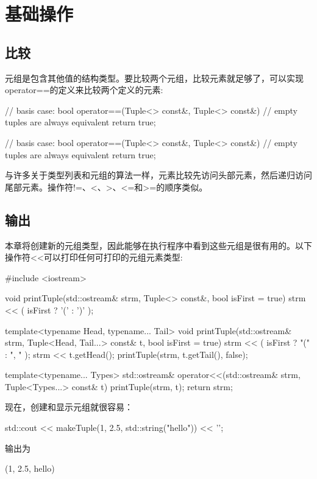 \section{基础操作}



\subsection{比较}

元组是包含其他值的结构类型。要比较两个元组，比较元素就足够了，可以实现operator==的定义来比较两个定义的元素:

\begin{cpp}
// basis case:
bool operator==(Tuple<> const&, Tuple<> const&)
{
	// empty tuples are always equivalent
	return true;
}

// basis case:
bool operator==(Tuple<> const&, Tuple<> const&)
{
	// empty tuples are always equivalent
	return true;
}
\end{cpp}

与许多关于类型列表和元组的算法一样，元素比较先访问头部元素，然后递归访问尾部元素。操作符!=、<、>、<=和>=的顺序类似。

\subsection{输出}

本章将创建新的元组类型，因此能够在执行程序中看到这些元组是很有用的。以下操作符<{}<可以打印任何可打印的元组元素类型:

\begin{cpp}
#include <iostream>

void printTuple(std::ostream& strm, Tuple<> const&, bool isFirst = true)
{
	strm << ( isFirst ? '(' : ')' );
}

template<typename Head, typename... Tail>
void printTuple(std::ostream& strm, Tuple<Head, Tail...> const& t,
				bool isFirst = true)
{
	strm << ( isFirst ? "(" : ", " );
	strm << t.getHead();
	printTuple(strm, t.getTail(), false);
}

template<typename... Types>
std::ostream& operator<<(std::ostream& strm, Tuple<Types...> const& t)
{
	printTuple(strm, t);
	return strm;
}
\end{cpp}

现在，创建和显示元组就很容易：

\begin{cpp}
std::cout << makeTuple(1, 2.5, std::string("hello")) << '\n';
\end{cpp}

输出为

\begin{shell}
(1, 2.5, hello)
\end{shell}





















